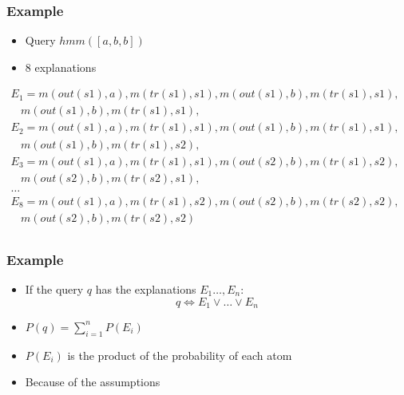 \documentclass[trans,aspectratio=1610]{beamer}
\begin{document}
\begin{frame}
  \frametitle{Example}
  \begin{itemize}
\item Query $hmm([a,b,b])$ 
\item 8 explanations
\end{itemize}
$\begin{array}{l}
E_1=m(out(s1),a),m(tr(s1),s1),m(out(s1),b),m(tr(s1),s1),\\
\ \ \ \ m(out(s1),b),m(tr(s1),s1),\\
E_2=m(out(s1),a),m(tr(s1),s1),m(out(s1),b),m(tr(s1),s1),\\
\ \ \ \ m(out(s1),b),m(tr(s1),s2),\\
E_3=m(out(s1),a),m(tr(s1),s1),m(out(s2),b),m(tr(s1),s2),\\
\ \ \ \ m(out(s2),b),m(tr(s2),s1),\\
\ldots\\
E_8=m(out(s1),a),m(tr(s1),s2),m(out(s2),b),m(tr(s2),s2),\\
\ \ \ \ m(out(s2),b),m(tr(s2),s2)\\
\end{array}$
\end{frame}
\begin{frame}
  \frametitle{Example}
 \begin{itemize}
\item If the query $q$ has the explanations $E_1\ldots,E_n$:
$$q\Leftrightarrow E_1\vee\ldots\vee E_n$$
\item  $P(q)=\sum_{i=1}^n P(E_i)$
\item  $P(E_i)$ is the product of the probability of each atom
\item Because of the assumptions
\end{itemize}
\end{frame}
\end{document}
